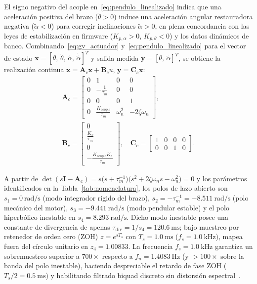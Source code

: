 El signo negativo del acople en~\eqref{eq:pendulo_linealizado} indica que una aceleración positiva del brazo ($\ddot{\theta}>0$) induce una aceleración angular restauradora negativa ($\ddot{\tilde{\alpha}}<0$) para corregir inclinaciones $\tilde{\alpha}>0$, en plena concordancia con las leyes de estabilización en firmware ($K_{p,\alpha}>0$, $K_{p,\theta}<0$) y los datos dinámicos de banco. Combinando~\eqref{eq:gv_actuador} y~\eqref{eq:pendulo_linealizado} para el vector de estado $\mathbf{x}=[\theta,\,\dot{\theta},\,\tilde{\alpha},\,\dot{\tilde{\alpha}}]^T$ y salida medida $\mathbf{y}=[\theta,\,\tilde{\alpha}]^T$, se obtiene la realización continua $\dot{\mathbf{x}}=\mathbf{A}_c\mathbf{x}+\mathbf{B}_c u$, $\mathbf{y}=\mathbf{C}_c\mathbf{x}$:
\begin{gather}
    \mathbf{A}_c = \begin{bmatrix}
        0 & 1 & 0 & 0 \\
        0 & -\frac{1}{\tau_m} & 0 & 0 \\
        0 & 0 & 0 & 1 \\
        0 & \frac{K_{\text{acople}}}{\tau_m} & \omega_n^2 & -2\zeta\omega_n
    \end{bmatrix}, \label{eq:matriz_ac} \\
    \mathbf{B}_c = \begin{bmatrix}
        0 \\
        \frac{K_v}{\tau_m} \\
        0 \\
        -\frac{K_{\text{acople}}K_v}{\tau_m}
    \end{bmatrix}, \quad
    \mathbf{C}_c = \begin{bmatrix}
        1 & 0 & 0 & 0 \\
        0 & 0 & 1 & 0
    \end{bmatrix}. \label{eq:matrices_bc_cc}
\end{gather}

A partir de $\det(s\mathbf{I}-\mathbf{A}_c) = s\bigl(s + \tau_m^{-1}\bigr)\bigl(s^2 + 2\zeta\omega_n s - \omega_n^2\bigr) = 0$ y los parámetros identificados en la Tabla~\ref{tab:nomenclatura}, los polos de lazo abierto son $s_1 = \qty{0}{\radian\per\second}$ (modo integrador rígido del brazo), $s_2 = -\tau_m^{-1} = \qty{-8.511}{\radian\per\second}$ (polo mecánico del motor), $s_3 = \qty{-9.441}{\radian\per\second}$ (modo pendular estable) y el polo hiperbólico inestable en $s_4 = \qty{+8.293}{\radian\per\second}$. Dicho modo inestable posee una constante de divergencia de apenas $\tau_{\text{div}} = 1/s_4 = \qty{120.6}{\milli\second}$; bajo muestreo por retenedor de orden cero (ZOH) $z = e^{s T_s}$ con $T_s = \qty{1.0}{\milli\second}$ ($f_s = \qty{1.0}{\kilo\hertz}$), mapea fuera del círculo unitario en $z_4 = 1.00833$. La frecuencia $f_s = \qty{1.0}{\kilo\hertz}$ garantiza un sobremuestreo superior a $700\times$ respecto a $f_n = \qty{1.4083}{\hertz}$ (y $>100\times$ sobre la banda del polo inestable), haciendo despreciable el retardo de fase ZOH ($T_s/2 = \qty{0.5}{\milli\second}$) y habilitando filtrado biquad discreto sin distorsión espectral~\cite{Astrom1997,Franklin2015}.

